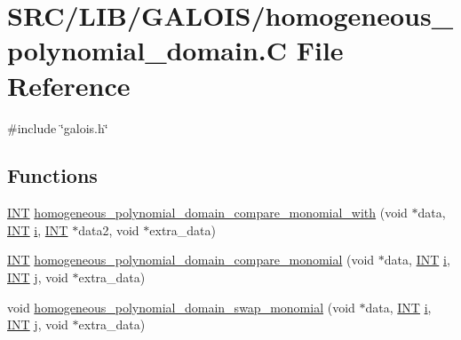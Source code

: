 \hypertarget{homogeneous__polynomial__domain_8_c}{}\section{S\+R\+C/\+L\+I\+B/\+G\+A\+L\+O\+I\+S/homogeneous\+\_\+polynomial\+\_\+domain.C File Reference}
\label{homogeneous__polynomial__domain_8_c}
{\ttfamily \#include \char`\"{}galois.\+h\char`\"{}}\newline
\subsection*{Functions}
\begin{DoxyCompactItemize}
\item 
\mbox{\hyperlink{galois_8h_a09fddde158a3a20bd2dcadb609de11dc}{I\+NT}} \mbox{\hyperlink{homogeneous__polynomial__domain_8_c_a0a0f8d40815145e0aceceabebad8d63d}{homogeneous\+\_\+polynomial\+\_\+domain\+\_\+compare\+\_\+monomial\+\_\+with}} (void $\ast$data, \mbox{\hyperlink{galois_8h_a09fddde158a3a20bd2dcadb609de11dc}{I\+NT}} \mbox{\hyperlink{alphabet2_8_c_acb559820d9ca11295b4500f179ef6392}{i}}, \mbox{\hyperlink{galois_8h_a09fddde158a3a20bd2dcadb609de11dc}{I\+NT}} $\ast$data2, void $\ast$extra\+\_\+data)
\item 
\mbox{\hyperlink{galois_8h_a09fddde158a3a20bd2dcadb609de11dc}{I\+NT}} \mbox{\hyperlink{homogeneous__polynomial__domain_8_c_aeeedb1f60479ef2d28468b061b654113}{homogeneous\+\_\+polynomial\+\_\+domain\+\_\+compare\+\_\+monomial}} (void $\ast$data, \mbox{\hyperlink{galois_8h_a09fddde158a3a20bd2dcadb609de11dc}{I\+NT}} \mbox{\hyperlink{alphabet2_8_c_acb559820d9ca11295b4500f179ef6392}{i}}, \mbox{\hyperlink{galois_8h_a09fddde158a3a20bd2dcadb609de11dc}{I\+NT}} \mbox{\hyperlink{alphabet2_8_c_a37d972ae0b47b9099e30983131d31916}{j}}, void $\ast$extra\+\_\+data)
\item 
void \mbox{\hyperlink{homogeneous__polynomial__domain_8_c_a00f821ce38623272d3af11a66c3b6f34}{homogeneous\+\_\+polynomial\+\_\+domain\+\_\+swap\+\_\+monomial}} (void $\ast$data, \mbox{\hyperlink{galois_8h_a09fddde158a3a20bd2dcadb609de11dc}{I\+NT}} \mbox{\hyperlink{alphabet2_8_c_acb559820d9ca11295b4500f179ef6392}{i}}, \mbox{\hyperlink{galois_8h_a09fddde158a3a20bd2dcadb609de11dc}{I\+NT}} \mbox{\hyperlink{alphabet2_8_c_a37d972ae0b47b9099e30983131d31916}{j}}, void $\ast$extra\+\_\+data)
\end{DoxyCompactItemize}


